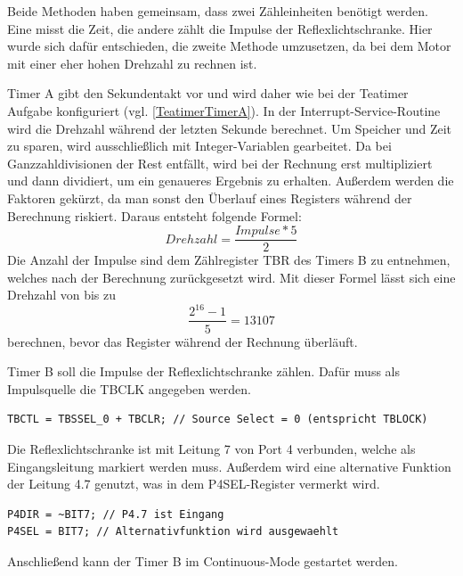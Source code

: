 \documentclass[12pt,a4paper,bibliography=totocnumbered,listof=totocnumbered]{scrartcl}
\begin{document}
Beide Methoden haben gemeinsam, dass zwei Zähleinheiten benötigt werden. Eine misst die Zeit, die andere zählt die Impulse der Reflexlichtschranke. Hier wurde sich dafür entschieden, die zweite Methode umzusetzen, da bei dem Motor mit einer eher hohen Drehzahl zu rechnen ist.

Timer A gibt den Sekundentakt vor und wird daher wie bei der Teatimer Aufgabe konfiguriert (vgl. \ref{TeatimerTimerA}). In der Interrupt-Service-Routine wird die Drehzahl während der letzten Sekunde berechnet. Um Speicher und Zeit zu sparen, wird ausschließlich mit Integer-Variablen gearbeitet. Da bei Ganzzahldivisionen der Rest entfällt, wird bei der Rechnung erst multipliziert und dann dividiert, um ein genaueres Ergebnis zu erhalten. Außerdem werden die Faktoren gekürzt, da man sonst den Überlauf eines Registers während der Berechnung riskiert. Daraus entsteht folgende Formel: \[ Drehzahl = \frac{Impulse*5}{2}  \] Die Anzahl der Impulse sind dem Zählregister TBR des Timers B zu entnehmen, welches nach der Berechnung zurückgesetzt wird. Mit dieser Formel lässt sich eine Drehzahl von bis zu \[ \frac{2^{16}-1}{5}=13107 \] berechnen, bevor das Register während der Rechnung überläuft. 

\vspace{1em}



Timer B soll die Impulse der Reflexlichtschranke zählen. Dafür muss als Impulsquelle die TBCLK angegeben werden.

\vspace{1em}
\begin{lstlisting}[caption=Konfiguration Timer B]
TBCTL = TBSSEL_0 + TBCLR; // Source Select = 0 (entspricht TBLOCK)
\end{lstlisting}

Die Reflexlichtschranke ist mit Leitung 7 von Port 4 verbunden, welche als Eingangsleitung markiert werden muss. Außerdem wird eine alternative Funktion der Leitung 4.7 genutzt, was in dem P4SEL-Register vermerkt wird.

\vspace{1em}
\begin{lstlisting}[caption=Konfiguration Port 4,label=KonfPort4]
P4DIR = ~BIT7; // P4.7 ist Eingang
P4SEL = BIT7; // Alternativfunktion wird ausgewaehlt
\end{lstlisting}

Anschließend kann der Timer B im Continuous-Mode gestartet werden. 
\end{document}
